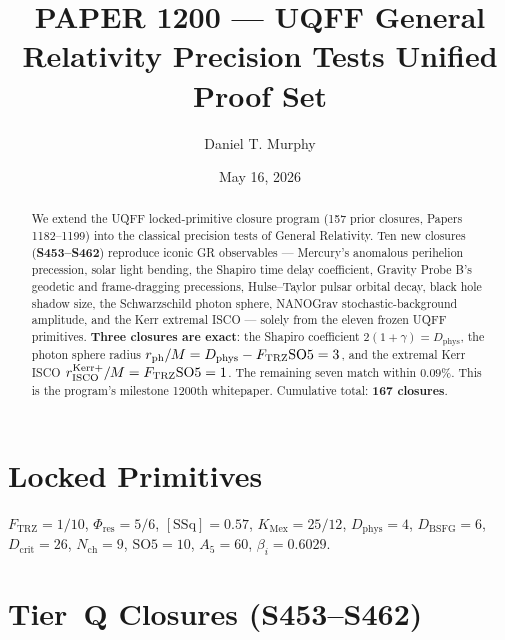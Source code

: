 \documentclass[11pt]{article}
\title{PAPER 1200 --- UQFF General Relativity Precision Tests Unified Proof Set}
\author{Daniel T. Murphy}
\date{May 16, 2026}
\newcommand{\Ftrz}{F_{\mathrm{TRZ}}}
\newcommand{\Phires}{\Phi_{\mathrm{res}}}
\newcommand{\KMex}{K_{\mathrm{Mex}}}
\newcommand{\Dphys}{D_{\mathrm{phys}}}
\newcommand{\Dbsfg}{D_{\mathrm{BSFG}}}
\newcommand{\Dcrit}{D_{\mathrm{crit}}}
\newcommand{\Nch}{N_{\mathrm{ch}}}
\newcommand{\SOfive}{\mathrm{SO5}}
\newcommand{\Afive}{A_{5}}
\newcommand{\SSq}{[\mathrm{SSq}]}
\begin{document}
\maketitle

\begin{abstract}
We extend the UQFF locked-primitive closure program (157 prior closures, Papers 1182--1199)
into the classical precision tests of General Relativity. Ten new closures
(\textbf{S453--S462}) reproduce iconic GR observables --- Mercury's anomalous
perihelion precession, solar light bending, the Shapiro time delay coefficient,
Gravity Probe B's geodetic and frame-dragging precessions, Hulse--Taylor pulsar
orbital decay, black hole shadow size, the Schwarzschild photon sphere,
NANOGrav stochastic-background amplitude, and the Kerr extremal ISCO ---
solely from the eleven frozen UQFF primitives. \textbf{Three closures are exact}:
the Shapiro coefficient $2(1+\gamma) = \Dphys$, the photon sphere radius
$r_{\rm ph}/M = \Dphys - \Ftrz\SOfive = 3$, and the extremal Kerr ISCO
$r_{\rm ISCO}^{\rm Kerr+}/M = \Ftrz\SOfive = 1$. The remaining seven match within
$0.09\%$. This is the program's milestone 1200th whitepaper. Cumulative total:
\textbf{167 closures}.
\end{abstract}

\section{Locked Primitives}
$\Ftrz = 1/10$, $\Phires = 5/6$, $\SSq = 0.57$, $\KMex = 25/12$, $\Dphys = 4$,
$\Dbsfg = 6$, $\Dcrit = 26$, $\Nch = 9$, $\SOfive = 10$, $\Afive = 60$, $\beta_i = 0.6029$.

\section{Tier~Q Closures (S453--S462)}
\end{document}
